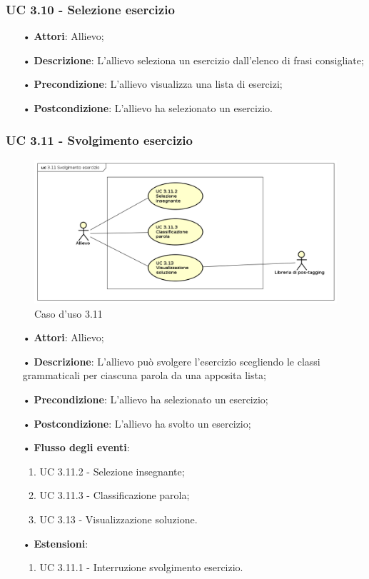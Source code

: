 \subsubsection{UC 3.10 - Selezione esercizio}
\begin{itemize}
\item[•]\textbf{Attori}: Allievo;
\item[•]\textbf{Descrizione}: L'allievo seleziona un esercizio dall'elenco di frasi consigliate;
\item[•]\textbf{Precondizione}: L'allievo visualizza una lista di esercizi;
\item[•]\textbf{Postcondizione}: L'allievo ha selezionato un esercizio.
\end{itemize}

\subsubsection{UC 3.11 - Svolgimento esercizio}
\begin{figure}[H]
	\centering
	\includegraphics[width=17cm]{img/UC311.png} 
	\caption{Caso d'uso 3.11}\label{fig:311}
\end{figure}
\begin{itemize}
	\item[•]\textbf{Attori}: Allievo;
	\item[•]\textbf{Descrizione}: L'allievo può svolgere l'esercizio scegliendo le classi grammaticali per ciascuna parola da una apposita lista;
	\item[•]\textbf{Precondizione}: L'allievo ha selezionato un esercizio;
	\item[•]\textbf{Postcondizione}: L'allievo ha svolto un esercizio;
	\item[•]\textbf{Flusso degli eventi}:
	\begin{enumerate}
		\item UC 3.11.2 - Selezione insegnante;
		\item UC 3.11.3 - Classificazione parola;
		\item UC 3.13 - Visualizzazione soluzione.
	\end{enumerate}
	\item[•]\textbf{Estensioni}:
	\begin{enumerate}
		\item UC 3.11.1 - Interruzione svolgimento esercizio.
	\end{enumerate}
\end{itemize}

